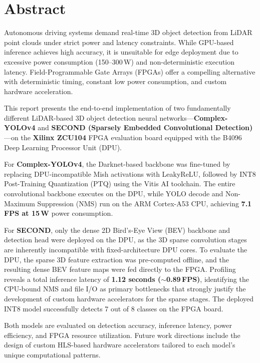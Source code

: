 \documentclass[12pt, a4paper]{report}
\begin{document}
\chapter*{Abstract}

Autonomous driving systems demand real-time 3D object detection from LiDAR point clouds under strict power and latency constraints. While GPU-based inference achieves high accuracy, it is unsuitable for edge deployment due to excessive power consumption (150--300\,W) and non-deterministic execution latency. Field-Programmable Gate Arrays (FPGAs) offer a compelling alternative with deterministic timing, constant low power consumption, and custom hardware acceleration.

This report presents the end-to-end implementation of two fundamentally different LiDAR-based 3D object detection neural networks---\textbf{Complex-YOLOv4} and \textbf{SECOND (Sparsely Embedded Convolutional Detection)}---on the \textbf{Xilinx ZCU104} FPGA evaluation board equipped with the B4096 Deep Learning Processor Unit (DPU).

For \textbf{Complex-YOLOv4}, the Darknet-based backbone was fine-tuned by replacing DPU-incompatible Mish activations with LeakyReLU, followed by INT8 Post-Training Quantization (PTQ) using the Vitis AI toolchain. The entire convolutional backbone executes on the DPU, while YOLO decode and Non-Maximum Suppression (NMS) run on the ARM Cortex-A53 CPU, achieving \textbf{7.1 FPS at 15\,W} power consumption.

For \textbf{SECOND}, only the dense 2D Bird's-Eye View (BEV) backbone and detection head were deployed on the DPU, as the 3D sparse convolution stages are inherently incompatible with fixed-architecture DPU cores. To evaluate the DPU, the sparse 3D feature extraction was pre-computed offline, and the resulting dense BEV feature maps were fed directly to the FPGA. Profiling reveals a total inference latency of \textbf{1.12 seconds ($\sim$0.89\,FPS)}, identifying the CPU-bound NMS and file I/O as primary bottlenecks that strongly justify the development of custom hardware accelerators for the sparse stages. The deployed INT8 model successfully detects 7 out of 8 classes on the FPGA board.

Both models are evaluated on detection accuracy, inference latency, power efficiency, and FPGA resource utilization. Future work directions include the design of custom HLS-based hardware accelerators tailored to each model's unique computational patterns.
\end{document}
